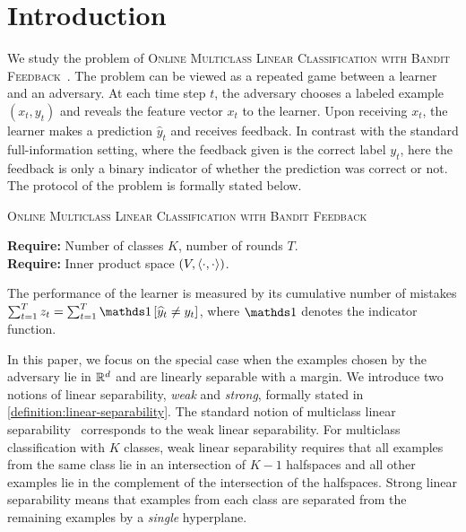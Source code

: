 \section{Introduction}
\label{section:introduction}

We study the problem of \textsc{Online Multiclass Linear Classification with
Bandit Feedback}~\citep{Kakade-Shalev-Shwartz-Tewari-2008}. The problem can be
viewed as a repeated game between a learner and an adversary. At each time step
$t$, the adversary chooses a labeled example $(x_t, y_t)$ and reveals the
feature vector $x_t$ to the learner. Upon receiving $x_t$, the learner makes a
prediction $\widehat{y}_t$ and receives feedback. In contrast with the standard
full-information setting, where the feedback given is the correct label $y_t$,
here the feedback is only a binary indicator of whether the prediction was
correct or not. The protocol of the problem is formally stated below.

\begin{protocol}[h]
\caption{\textsc{Online Multiclass Linear Classification with Bandit Feedback}
\label{algorithm:game-protocol}}
\textbf{Require:} Number of classes $K$, number of rounds $T$. \\
\textbf{Require:} Inner product space $(V,\left\langle \cdot, \cdot \right\rangle)$. \\
\end{protocol}

The performance of the learner is measured by its cumulative number of
mistakes $\sum_{t=1}^T z_t = \sum_{t=1}^T \indicator{\widehat y_t \neq y_t}$,
where $\one$ denotes the indicator function.

In this paper, we focus on the special case when the examples chosen by the
adversary lie in $\mathbb{R}^d$ and are linearly separable with a margin. We introduce
two notions of linear separability, \emph{weak} and \emph{strong}, formally
stated in \autoref{definition:linear-separability}. The standard notion of
multiclass linear separability~\citep{Crammer-Singer-2003} corresponds to the
weak linear separability. For multiclass classification with $K$ classes, weak
linear separability requires that all examples from the same class lie in an
intersection of $K-1$ halfspaces and all other examples lie in the complement of
the intersection of the halfspaces. Strong linear separability means that
examples from each class are separated from the remaining examples by a
\emph{single} hyperplane.

